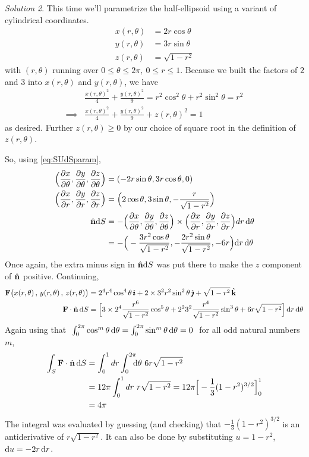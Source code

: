 \begin{eg}
\medskip
\noindent\textit{Solution 2}.  This time we'll parametrize the 
half-ellipsoid using a variant of cylindrical coordinates.
\begin{align*}
x(r,\theta)&=2r\cos\theta\\
y(r,\theta)&=3r\sin\theta\\
z(r,\theta)&=\sqrt{1-r^2}
\end{align*}
with $(r,\theta)$ running over $0\le\theta\le 2\pi,\ 0\le r\le1$. 
Because we built the factors of $2$ and $3$ into $x(r,\theta)$
and $y(r,\theta)$, we have 
\begin{align*}
&\frac{x(r,\theta)^2}{4} + \frac{y(r,\theta)^2}{9}
    =r^2\cos^2\theta+r^2\sin^2\theta = r^2 \\
\implies  &\frac{x(r,\theta)^2}{4} + \frac{y(r,\theta)^2}{9} +z(r,\theta)^2=1
\end{align*}
as desired. Further $z(r,\theta)\ge 0$ by our choice of square root in the
definition of $z(r,\theta)$.

So, using \eqref{eq:SUdSparam},
\begin{align*}
\Big(\frac{\partial x}{\partial \theta},\frac{\partial y}{\partial \theta},
\frac{\partial z}{\partial \theta}\Big)
&=(-2r\sin\theta,3r\cos\theta,0)
\\
\Big(\frac{\partial x}{\partial r},\frac{\partial y}{\partial r},
\frac{\partial z}{\partial r}\Big)
&=\Big(2\cos\theta,3\sin\theta,-\frac{r}{\sqrt{1-r^2}}\Big)
\\
\hat{\mathbf{n}} \mathrm{d}S&=
-\Big(\frac{\partial x}{\partial\theta},\frac{\partial y}{\partial\theta},
                 \frac{\partial z}{\partial\theta}\Big)
\times\Big(\frac{\partial x}{\partial r},\frac{\partial y}{\partial r},
            \frac{\partial z}{\partial r}\Big)dr\,\mathrm{d}\theta\\
&=-\Big(-\frac{3r^2\cos\theta}{\sqrt{1-r^2}},
-\frac{2r^2\sin\theta}{\sqrt{1-r^2}},-6r\Big)\mathrm{d}r\,\mathrm{d}\theta
\end{align*}
Once again, the extra minus sign in $\hat{\mathbf{n}} \mathrm{d}S$ was put there to make 
the $z$ component of $\hat{\mathbf{n}}$ positive. Continuing,
\begin{align*}
\mathbf{F}\big(x(r,\theta)\,,\,y(r,\theta)\,,\,z(r,\theta)\big)
 &=2^4r^4\cos^4\theta\,\hat{\pmb{\imath}}+2\times 3^2r^2\sin^2\theta\,\hat{\pmb{\jmath}}+\sqrt{1-r^2}\,\hat{\mathbf{k}}
\\
\mathbf{F}\cdot\hat{\mathbf{n}}\, \mathrm{d}S&=\Big[3\times2^4\frac{r^6}{\sqrt{1-r^2}}\cos^5\theta
+2^2 3^2\frac{r^4}{\sqrt{1-r^2}}
\sin^3\theta+6r\sqrt{1-r^2}\Big]\,\mathrm{d}r\,\mathrm{d}\theta
\end{align*}
 Again using that  
$\ \int_0^{2\pi} \cos^m\theta\,\dee{\theta}
  =\int_0^{2\pi} \sin^m\theta\,\dee{\theta}=0\ $ for all
odd natural numbers $m$,
\begin{align*}
\int_S \mathbf{F}\cdot\hat{\mathbf{n}}\, \mathrm{d}S
&=\int_0^1 dr\int_0^{2\pi}\hskip-6pt\mathrm{d}\theta\ 6r\sqrt{1-r^2} \\
&=12\pi\int_0^1 dr\ r\sqrt{1-r^2}
=12\pi\Big[-\frac{1}{3}(1-r^2)^{3/2}\Big]_0^1\\
&=4\pi
\end{align*}
The integral was evaluated by guessing (and checking) that 
$-\frac{1}{3}(1-r^2)^{3/2}$ is an antiderivative of $r\sqrt{1-r^2}$.
It can also be done by substituting $u=1-r^2$, 
$\mathrm{d}u=-2r\,\mathrm{d}r$.



\end{eg}
